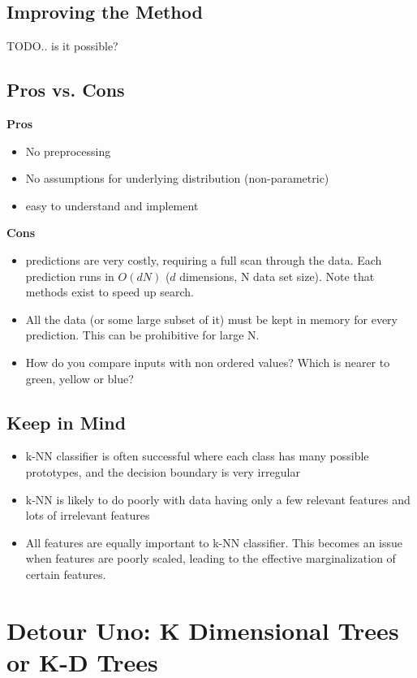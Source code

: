 \documentclass[10pt]{article}
\begin{document}
	
	\subsection*{Improving the Method}
		TODO.. is it possible?
	\subsection*{Pros vs. Cons}
		\noindent \textbf{Pros} 
		\begin{itemize}
			\item No preprocessing 
			\item No assumptions for underlying distribution (non-parametric)
			\item easy to understand and implement
		\end{itemize}
		
		\noindent \textbf{Cons}
		\begin{itemize}
			\item predictions are very costly, requiring a full scan through the data. Each prediction runs in
				$O(dN)$ ($d$ dimensions, N data set size). Note that methods exist to speed up search.
			\item All the data (or some large subset of it) must be kept in memory for every prediction. This
				can be prohibitive for large N.
			\item How do you compare inputs with non ordered values? Which is nearer to green, yellow or 
				blue? 
		\end{itemize}
	
	\subsection*{Keep in Mind}
		\begin{itemize}
			\item k-NN classifier is often successful where each class has many possible prototypes, and the 
				decision boundary is very irregular
			\item k-NN is likely to do poorly with data having only a few relevant features and lots of irrelevant features 
			\item All features are equally important to k-NN classifier. This becomes an issue when features are 
			poorly scaled, leading to the effective marginalization of certain features. 
		\end{itemize}
	
		
\section*{Detour Uno: K Dimensional Trees  or K-D Trees }
\end{document}
